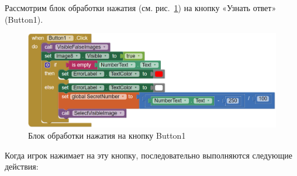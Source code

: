 Рассмотрим блок обработки нажатия (см. рис.~\ref{fig:block:button:click}) на кнопку «Узнать ответ» (Button1).
\begin{figure}
  \includegraphics{./graphics/programs/guess_numbers/block_Button1Click_AppInventor_2018.png}
    \caption[Блок обработки нажатия на кнопку Button1.]{Блок обработки нажатия на кнопку Button1}
  \label{fig:block:button:click}
\end{figure}
Когда игрок нажимает на эту кнопку, последовательно выполняются следующие действия:
